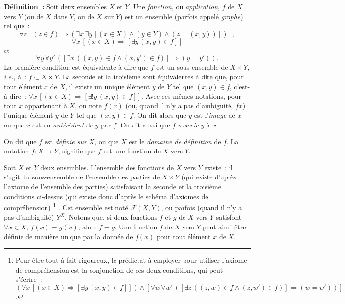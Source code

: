 \noindent\textbf{Définition :} Soit deux ensembles $X$ et $Y$. Une \textit{fonction}, ou \textit{application}, $f$ de $X$ vers $Y$ (ou de $X$ dans $Y$, ou de $X$ sur $Y$) est un ensemble (parfois appelé \textit{graphe}) tel que : 
\begin{equation*}
    \forall z \, [ (z \in f) \Rightarrow (\exists x \, \exists y \, [(x \in X) \wedge (y \in Y) \wedge (z = (x,y))])],
\end{equation*}
\begin{equation*}
    \forall x \, [(x \in X) \Rightarrow [\exists y \, (x,y) \in f]]
\end{equation*}
et 
\begin{equation*}
    \forall y \, \forall y' \, ([\exists x \, ((x,y) \in f \wedge (x,y') \in f)] \Rightarrow (y = y')).
\end{equation*}
La première condition est équivalente à dire que $f$ est un sous-ensemble de $X \times Y$, \textit{i.e.}, à : $f \subset X \times Y$. 
La seconde et la troisième sont équivalentes à dire que, pour tout élément $x$ de $X$, il existe un unique élément $y$ de $Y$ tel que $(x,y) \in f$, c'est-à-dire : $\forall x \, [(x \in X) \Rightarrow [\exists ! y \, (x,y) \in f]]$. 
Avec ces mêmes notations, pour tout $x$ appartenant à $X$, on note $f(x)$ (ou, quand il n'y a pas d'ambiguité, $f x$) l'unique élément $y$ de $Y$ tel que $(x,y) \in f$. 
On dit alors que $y$ est l'\textit{image} de $x$ ou que $x$ est un \textit{antécédent} de $y$ par $f$. 
On dit aussi que $f$ \textit{associe} $y$ à $x$. 

On dit que $f$ est \textit{définie sur} $X$, ou que $X$ est le \textit{domaine de définition} de $f$. 
La notation $f: X \to Y$, signifie que $f$ est une fonction de $X$ vers $Y$. 

Soit $X$ et $Y$ deux ensembles. 
L'ensemble des fonctions de $X$ vers $Y$ existe : il s'agit du sous-ensemble de l'ensemble des parties de $X \times Y$ (qui existe d'après l'axiome de l'ensemble des parties) satisfaisant la seconde et la troisième conditions ci-dessus (qui existe donc d'après le schéma d'axiomes de compréhension)%
\footnote{Pour être tout à fait rigoureux, le prédictat à employer pour utiliser l'axiome de compréhension est la conjonction de ces deux conditions, qui peut s'écrire : $(\forall x \, [(x \in X) \Rightarrow [\exists y \, (x,y) \in f]]) \wedge [\forall w \, \forall w' \, ([\exists z \, ((z,w) \in f \wedge (z,w') \in f)] \Rightarrow (w = w'))]$.}%
. 
Cet ensemble est noté $\mathcal{F}(X,Y)$, ou parfois (quand il n'y a pas d'ambiguité) $Y^X$. 
Notons que, si deux fonctions $f$ et $g$ de $X$ vers $Y$ satisfont $\forall x \in X, \, f(x) = g(x)$, alors $f = g$. 
Une fonction $f$ de $X$ vers $Y$ peut ainsi être définie de manière unique par la donnée de $f(x)$ pour tout élément $x$ de $X$.

